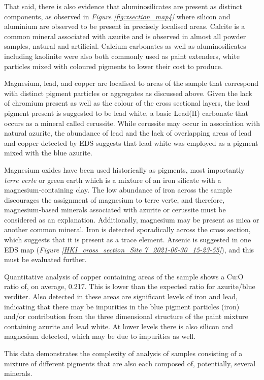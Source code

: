 That said, there is also evidence that aluminosilicates are present as distinct components, as observed in \textit{Figure \ref{fig:xsection_map4}} where silicon and aluminium are observed to be present in precisely localised areas. Calcite is a common mineral associated with azurite and is observed in almost all powder samples, natural and artificial. Calcium carbonates as well as aluminosilicates including kaolinite were also both commonly used as paint extenders, white particles mixed with coloured pigments to lower their cost to produce.~\autocite{Townsend}

Magnesium, lead, and copper are localised to areas of the sample that correspond with distinct pigment particles or aggregates as discussed above. Given the lack of chromium present as well as the colour of the cross sectional layers, the lead pigment present is suggested to be lead white, a basic Lead(II) carbonate that occurs as a mineral called cerussite. While cerussite may occur in association with natural azurite,\autocite{Aru} the abundance of lead and the lack of overlapping areas of lead and copper detected by EDS suggests that lead white was employed as a pigment mixed with the blue azurite.

Magnesium oxides have been used historically as pigments, most importantly \textit{terre verte} or green earth which is a mixture of an iron silicate with a magnesium-containing clay. The low abundance of iron across the sample discourages the assignment of magnesium to terre verte, and therefore, magnesium-based minerals associated with azurite or cerussite must be considered as an explanation. Additionally, magnesium may be present as mica or another common mineral. Iron is detected sporadically across the cross section, which suggests that it is present as a trace element. Arsenic is suggested in one EDS map (\textit{Figure \ref{HKI_cross_section_Site 7_2021-06-30_15-23-55}}), and this must be evaluated further.

Quantitative analysis of copper containing areas of the sample shows a Cu:O ratio of, on average, 0.217. This is lower than the expected ratio for azurite/blue verditer. Also detected in these areas are significant levels of iron and lead, indicating that there may be impurities in the blue pigment particles (iron) and/or contribution from the three dimensional structure of the paint mixture containing azurite and lead white. At lower levels there is also silicon and magnesium detected, which may be due to impurities as well. 

This data demonstrates the complexity of analysis of samples consisting of a mixture of different pigments that are also each composed of, potentially, several minerals.

